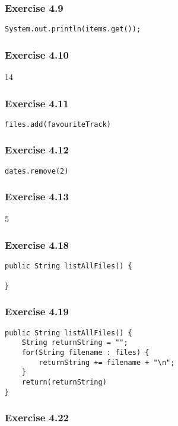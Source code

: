 \subsubsection{Exercise 4.9}
\begin{lstlisting}
System.out.println(items.get());
\end{lstlisting}

\subsubsection{Exercise 4.10}
14

\subsubsection{Exercise 4.11}
\begin{lstlisting}
files.add(favouriteTrack)
\end{lstlisting}

\subsubsection{Exercise 4.12}
\begin{lstlisting}
dates.remove(2)
\end{lstlisting}

\subsubsection{Exercise 4.13}
5

\subsubsection{Exercise 4.18}
\begin{lstlisting}
public String listAllFiles() {
    
}
\end{lstlisting}

\subsubsection{Exercise 4.19}
\begin{lstlisting}
public String listAllFiles() {
    String returnString = "";
    for(String filename : files) {
        returnString += filename + "\n";
    }
    return(returnString)
}
\end{lstlisting}

\subsubsection{Exercise 4.22}


